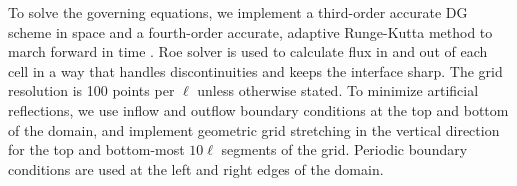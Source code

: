 To solve the governing equations, we implement a third-order accurate
\ac{DG} scheme in space and a fourth-order accurate, adaptive
Runge-Kutta method to march forward in time
\citep{HenrydeFrahan2015}. Roe solver is used to calculate flux in and
out of each cell in a way that handles discontinuities and keeps the
interface sharp. The grid resolution is 100 points per $\ell$ unless
otherwise stated. To minimize artificial reflections, we use inflow
and outflow boundary conditions at the top and bottom of the domain,
and implement geometric grid stretching in the vertical direction for
the top and bottom-most $10\ell$ segments of the grid. Periodic
boundary conditions are used at the left and right edges of the
domain.

